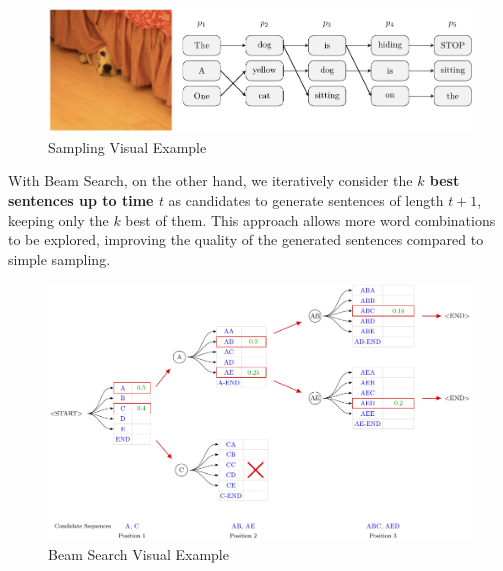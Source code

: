 \begin{figure}[!htbp]
    \centering
    \includegraphics[width=\linewidth]{tikz/chapter7 - Sampling.pdf}
    \caption{Sampling Visual Example}
\end{figure}

With Beam Search, on the other hand, we iteratively consider the \textbf{$k$ best sentences up to time $t$} as candidates to generate sentences of length $t+1$, keeping only the $k$ best of them. This approach allows more word combinations to be explored, improving the quality of the generated sentences compared to simple sampling.

\begin{figure}[!htbp]
    \centering
    \includegraphics[width=\linewidth]{tikz/chapter7 - Beam Search.pdf}
    \caption{Beam Search Visual Example}
\end{figure}


